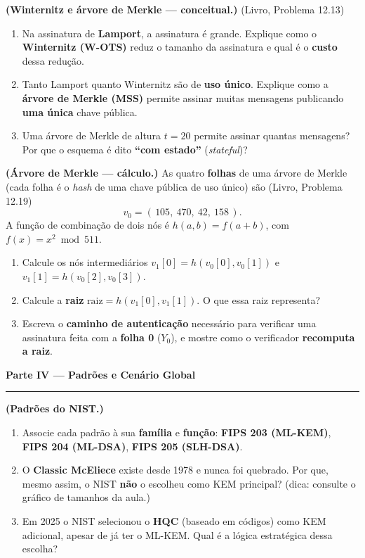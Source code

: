 \documentclass[11pt,a4paper]{article}
\newcommand{\livro}[1]{{\footnotesize\color{black!50}(Livro, Problema #1)}}
\newcommand{\parte}[1]{%
    \par\vspace{1.6em}\noindent
    {\large\bfseries\color{red!55!black}#1}%
    \par\nobreak\vspace{-0.4em}\noindent
    {\color{red!45!black}\rule{\linewidth}{1.0pt}}%
    \par\nobreak\vspace{0.2em}
}
\begin{document}
\begin{exercicio}
\textbf{(Winternitz e \'{a}rvore de Merkle --- conceitual.)} \livro{12.13}
\begin{enumerate}[label=(\alph*)]
    \item Na assinatura de \textbf{Lamport}, a assinatura \'{e} grande. Explique como o \textbf{Winternitz (W-OTS)} reduz o tamanho da assinatura e qual \'{e} o \textbf{custo} dessa redu\c{c}\~{a}o.
    \item Tanto Lamport quanto Winternitz s\~{a}o de \textbf{uso \'{u}nico}. Explique como a \textbf{\'{a}rvore de Merkle (MSS)} permite assinar muitas mensagens publicando \textbf{uma \'{u}nica} chave p\'{u}blica.
    \item Uma \'{a}rvore de Merkle de altura $t = 20$ permite assinar quantas mensagens? Por que o esquema \'{e} dito \textbf{``com estado''} (\textit{stateful})?
\end{enumerate}
\end{exercicio}

\begin{exercicio}
\textbf{(\'{A}rvore de Merkle --- c\'{a}lculo.)} As quatro \textbf{folhas} de uma \'{a}rvore de Merkle (cada folha \'{e} o \emph{hash} de uma chave p\'{u}blica de uso \'{u}nico) s\~{a}o \livro{12.19}
\[
v_0 = (\,105,\ 470,\ 42,\ 158\,).
\]
A fun\c{c}\~{a}o de combina\c{c}\~{a}o de dois n\'{o}s \'{e} $h(a,b) = f(a+b)$, com $f(x) = x^2 \bmod 511$.
\begin{enumerate}[label=(\alph*)]
    \item Calcule os n\'{o}s intermedi\'{a}rios $v_1[0] = h(v_0[0], v_0[1])$ e $v_1[1] = h(v_0[2], v_0[3])$.
    \item Calcule a \textbf{raiz} $\text{raiz} = h(v_1[0], v_1[1])$. O que essa raiz representa?
    \item Escreva o \textbf{caminho de autentica\c{c}\~{a}o} necess\'{a}rio para verificar uma assinatura feita com a \textbf{folha 0} ($Y_0$), e mostre como o verificador \textbf{recomputa a raiz}.
\end{enumerate}
\end{exercicio}

\parte{Parte IV --- Padr\~{o}es e Cen\'{a}rio Global}

\begin{exercicio}
\textbf{(Padr\~{o}es do NIST.)}
\begin{enumerate}[label=(\alph*)]
    \item Associe cada padr\~{a}o \`{a} sua \textbf{fam\'{i}lia} e \textbf{fun\c{c}\~{a}o}: \textbf{FIPS 203 (ML-KEM)}, \textbf{FIPS 204 (ML-DSA)}, \textbf{FIPS 205 (SLH-DSA)}.
    \item O \textbf{Classic McEliece} existe desde 1978 e nunca foi quebrado. Por que, mesmo assim, o NIST \textbf{n\~{a}o} o escolheu como KEM principal? (dica: consulte o gr\'{a}fico de tamanhos da aula.)
    \item Em 2025 o NIST selecionou o \textbf{HQC} (baseado em c\'{o}digos) como KEM adicional, apesar de j\'{a} ter o ML-KEM. Qual \'{e} a l\'{o}gica estrat\'{e}gica dessa escolha?
\end{enumerate}
\end{exercicio}
\end{document}
